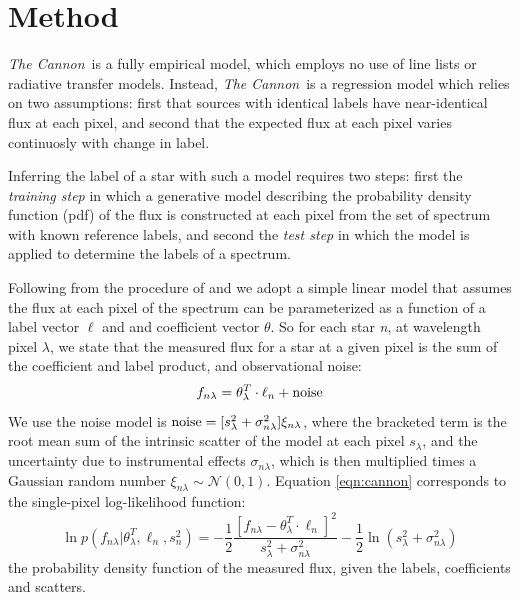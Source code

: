 \documentclass[modern]{aastex62}
\newcommand{\thecannon}{\textsl{The Cannon}}
\begin{document}



\section{Method}\label{sec:cannon}

\thecannon\ is a fully empirical model, which employs no use of line lists or radiative transfer models. Instead, \thecannon\ is a regression model which relies on two assumptions: first that sources with identical labels have near-identical flux at each pixel, and second that the expected flux at each pixel varies continuosly with change in label. 

Inferring the label of a star with such a model requires two steps: first the \emph{training step} in which a generative model describing the probability density function (pdf) of the flux is constructed at each pixel from the set of spectrum with known reference labels, and second the \emph{test step} in which the model is applied to determine the labels of a spectrum.

Following from the procedure of \citealt{Ness:2015} and \citealt{Ho:2017a} we adopt a simple linear model that assumes the flux at each pixel of the spectrum can be parameterized as a function of a label vector $\ell$ and and coefficient vector \emph{$\theta$}. So for each star \emph{n}, at wavelength pixel \emph{$\lambda$}, we state that the measured flux for a star at a given pixel is the sum of the coefficient and label product, and observational noise:
\begin{equation}
	f_{n\lambda} = \theta_{\lambda}^{T} \cdot \ell_{n} + {\rm noise} \label{eqn:cannon}
\end{equation} 
We use the noise model is ${\rm noise}=[s_{\lambda}^2 + \sigma_{n\lambda}^2]\xi_{n\lambda}$, where the bracketed term is the root mean sum of the intrinsic scatter of the model at each pixel \emph{$s_{\lambda}$}, and the uncertainty due to instrumental effects \emph{$\sigma_{n\lambda}$}, which is then multiplied times a Gaussian random number $\xi_{n\lambda} \sim \mathcal{N} (0,1)$. Equation \ref{eqn:cannon} corresponds to the single-pixel log-likelihood function:
\begin{equation}
	\ln p(f_{n\lambda}|\theta^T_{\lambda}, \ell_n, s^2_n) = 
	-\frac{1}{2}\frac{[f_{n\lambda} - \theta_{\lambda}^{T} \cdot \ell_{n}]^2}{s_{\lambda}^2 + \sigma_{n\lambda}^2} - \frac{1}{2} \ln(s_{\lambda}^2 + \sigma_{n\lambda}^2) 
	\label{eqn:likelihood}
\end{equation}
the probability density function of the measured flux, given the labels, coefficients and scatters.
\end{document}
